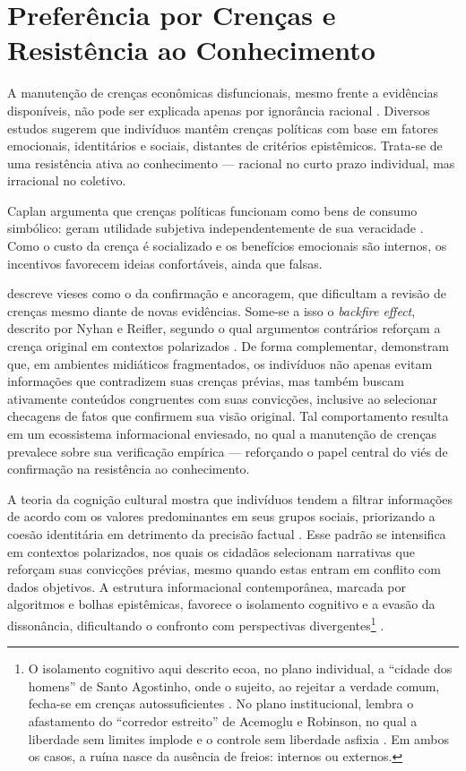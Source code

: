 \section{Preferência por Crenças e Resistência ao Conhecimento}

A manutenção de crenças econômicas disfuncionais, mesmo frente a evidências disponíveis, não pode ser explicada apenas por ignorância racional \cite{downs1957economic}. Diversos estudos sugerem que indivíduos mantêm crenças políticas com base em fatores emocionais, identitários e sociais, distantes de critérios epistêmicos. Trata-se de uma resistência ativa ao conhecimento — racional no curto prazo individual, mas irracional no coletivo.

Caplan argumenta que crenças políticas funcionam como bens de consumo simbólico: geram utilidade subjetiva independentemente de sua veracidade \cite{The_Myth_of_the_Rational_Voter}. Como o custo da crença é socializado e os benefícios emocionais são internos, os incentivos favorecem ideias confortáveis, ainda que falsas.

 descreve vieses como o da confirmação e ancoragem, que dificultam a revisão de crenças mesmo diante de novas evidências. Some-se a isso o \textit{backfire effect}, descrito por Nyhan e Reifler, segundo o qual argumentos contrários reforçam a crença original em contextos polarizados \cite{nyhan2010when}. De forma complementar,  demonstram que, em ambientes midiáticos fragmentados, os indivíduos não apenas evitam informações que contradizem suas crenças prévias, mas também buscam ativamente conteúdos congruentes com suas convicções, inclusive ao selecionar checagens de fatos que confirmem sua visão original. Tal comportamento resulta em um ecossistema informacional enviesado, no qual a manutenção de crenças prevalece sobre sua verificação empírica — reforçando o papel central do viés de confirmação na resistência ao conhecimento.

A teoria da cognição cultural mostra que indivíduos tendem a filtrar informações de acordo com os valores predominantes em seus grupos sociais, priorizando a coesão identitária em detrimento da precisão factual \cite{kahan2012polarization}. Esse padrão se intensifica em contextos polarizados, nos quais os cidadãos selecionam narrativas que reforçam suas convicções prévias, mesmo quando estas entram em conflito com dados objetivos. A estrutura informacional contemporânea, marcada por algoritmos e bolhas epistêmicas, favorece o isolamento cognitivo e a evasão da dissonância, dificultando o confronto com perspectivas divergentes\footnote{O isolamento cognitivo aqui descrito ecoa, no plano individual, a “cidade dos homens” de Santo Agostinho, onde o sujeito, ao rejeitar a verdade comum, fecha-se em crenças autossuficientes \cite{agostinho1990civitate}. No plano institucional, lembra o afastamento do “corredor estreito” de Acemoglu e Robinson, no qual a liberdade sem limites implode e o controle sem liberdade asfixia \cite{acemoglu2019narrow}. Em ambos os casos, a ruína nasce da ausência de freios: internos ou externos.} \cite{sunstein2017republic}. 

